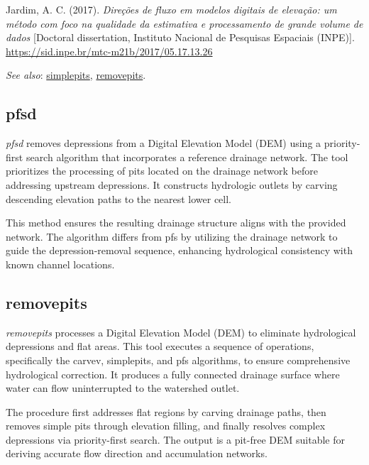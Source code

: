 \documentclass[
]{book}
\theoremstyle{definition}
\theoremstyle{definition}
\theoremstyle{definition}
\theoremstyle{definition}
\theoremstyle{remark}
\begin{document}
Jardim, A. C. (2017). \emph{Direções de fluxo em modelos digitais de elevação: um método com foco na qualidade da estimativa e processamento de grande volume de dados} {[}Doctoral dissertation, Instituto Nacional de Pesquisas Espaciais (INPE){]}. \href{http://mtc-m21b.sid.inpe.br/col/sid.inpe.br/mtc-m21b/2017/05.17.13.26/doc/publicacao.pdf?metadatarepository=sid.inpe.br/mtc-m21b/2017/05.17.13.26.57&mirror=sid.inpe.br/mtc-m21b/2013/09.26.14.25.22&languagebutton=en}{https://sid.inpe.br/mtc-m21b/2017/05.17.13.26}

\emph{See also}: \hyperref[simplepits]{simplepits}, \hyperref[removepits]{removepits}.

\subsection{pfsd}\label{pfsd}

\emph{pfsd} removes depressions from a Digital Elevation Model (DEM) using a priority-first search algorithm that incorporates a reference drainage network. The tool prioritizes the processing of pits located on the drainage network before addressing upstream depressions. It constructs hydrologic outlets by carving descending elevation paths to the nearest lower cell.

This method ensures the resulting drainage structure aligns with the provided network. The algorithm differs from pfs by utilizing the drainage network to guide the depression-removal sequence, enhancing hydrological consistency with known channel locations.

\subsection{removepits}\label{removepits}

\emph{removepits} processes a Digital Elevation Model (DEM) to eliminate hydrological depressions and flat areas. This tool executes a sequence of operations, specifically the carvev, simplepits, and pfs algorithms, to ensure comprehensive hydrological correction. It produces a fully connected drainage surface where water can flow uninterrupted to the watershed outlet.

The procedure first addresses flat regions by carving drainage paths, then removes simple pits through elevation filling, and finally resolves complex depressions via priority-first search. The output is a pit-free DEM suitable for deriving accurate flow direction and accumulation networks.
\end{document}
